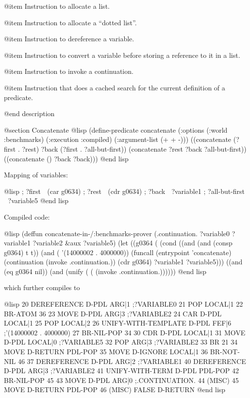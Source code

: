 {@item %
Instruction to allocate a list.

@item %
Instruction to allocate a ``dotted list''.

@item %
Instruction to dereference a variable.

@item %
Instruction to convert a variable before storing
a reference to it in a list.

@item %
Instruction to invoke a continuation.

@item %
Instruction that does a cached search for
the current definition of a predicate.

@end description

@section Concatenate
@lisp
(define-predicate concatenate
  (:options (:world :benchmarks) 
            (:execution :compiled) 
            (:argument-list (+ + -)))
  ((concatenate (?first . ?rest) ?back (?first . ?all-but-first))
   (concatenate ?rest ?back ?all-but-first))
  ((concatenate () ?back ?back)))
@end lisp

Mapping of variables:

@lisp
; ?first  (car g0634)
; ?rest  (cdr g0634)
; ?back  ?variable1
; ?all-but-first  ?variable5
@end lisp

Compiled code:

@lisp
(deffun concatenate-in-/:benchmarks-prover
        (.continuation. ?variable0 ?variable1 ?variable2
         &aux ?variable5)
  (let ((g0364 (%
    (cond ((and (and (consp g0364) t t))
           (and (%
                                           '(14000002 . 4000000))
                (funcall (entrypoint 'concatenate)
                         (continuation 
                           (invoke .continuation.))
                         (cdr g0364)
                         ?variable1
                         ?variable5)))
          ((and (eq g0364 nil))
           (and (unify (%
                       (%
                (invoke .continuation.))))))
@end lisp

which further compiles to

@lisp
20 DEREFERENCE D-PDL ARG|1  ;?VARIABLE0
21 POP LOCAL|1
22 BR-ATOM 36
23 MOVE D-PDL ARG|3       ;?VARIABLE2
24 CAR D-PDL LOCAL|1
25 POP LOCAL|2
26 UNIFY-WITH-TEMPLATE D-PDL FEF|6       ;'(14000002 . 4000000)
27 BR-NIL-POP 34
30 CDR D-PDL LOCAL|1
31 MOVE D-PDL LOCAL|0     ;?VARIABLE5
32 POP ARG|3                  ;?VARIABLE2
33 BR 21
34 MOVE D-RETURN PDL-POP
35 MOVE D-IGNORE LOCAL|1
36 BR-NOT-NIL 46
37 DEREFERENCE D-PDL ARG|2  ;?VARIABLE1
40 DEREFERENCE D-PDL ARG|3  ;?VARIABLE2
41 UNIFY-WITH-TERM D-PDL PDL-POP
42 BR-NIL-POP 45
43 MOVE D-PDL ARG|0       ;.CONTINUATION.
44 (MISC) %
45 MOVE D-RETURN PDL-POP
46 (MISC) FALSE D-RETURN
@end lisp

}
